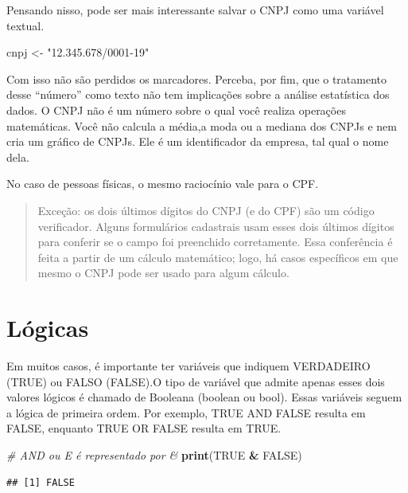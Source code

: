 \documentclass[
]{book}
\newenvironment{Shaded}{\begin{snugshade}}{\end{snugshade}}
\newcommand{\CommentTok}[1]{\textcolor[rgb]{0.56,0.35,0.01}{\textit{#1}}}
\newcommand{\KeywordTok}[1]{\textcolor[rgb]{0.13,0.29,0.53}{\textbf{#1}}}
\newcommand{\NormalTok}[1]{#1}
\newcommand{\OperatorTok}[1]{\textcolor[rgb]{0.81,0.36,0.00}{\textbf{#1}}}
\newcommand{\OtherTok}[1]{\textcolor[rgb]{0.56,0.35,0.01}{#1}}
\newcommand{\StringTok}[1]{\textcolor[rgb]{0.31,0.60,0.02}{#1}}
\begin{document}
Pensando nisso, pode ser mais interessante salvar o CNPJ como uma variável textual.

\begin{Shaded}
\begin{Highlighting}[]
\NormalTok{cnpj <-}\StringTok{ "12.345.678/0001-19"}
\end{Highlighting}
\end{Shaded}

Com isso não são perdidos os marcadores. Perceba, por fim, que o tratamento desse ``número'' como texto não tem implicações sobre a análise estatística dos dados. O CNPJ não é um número sobre o qual você realiza operações matemáticas. Você não calcula a média,a moda ou a mediana dos CNPJs e nem cria um gráfico de CNPJs. Ele é um identificador da empresa, tal qual o nome dela.

No caso de pessoas físicas, o mesmo raciocínio vale para o CPF.

\begin{quote}
Exceção: os dois últimos dígitos do CNPJ (e do CPF) são um código verificador. Alguns formulários cadastrais usam esses dois últimos dígitos para conferir se o campo foi preenchido corretamente. Essa conferência é feita a partir de um cálculo matemático; logo, há casos específicos em que mesmo o CNPJ pode ser usado para algum cálculo.
\end{quote}

\hypertarget{luxf3gicas}{%
\section{Lógicas}\label{luxf3gicas}}

Em muitos casos, é importante ter variáveis que indiquem VERDADEIRO (TRUE) ou FALSO (FALSE).O tipo de variável que admite apenas esses dois valores lógicos é chamado de Booleana (boolean ou bool). Essas variáveis seguem a lógica de primeira ordem. Por exemplo, TRUE AND FALSE resulta em FALSE, enquanto TRUE OR FALSE resulta em TRUE.

\begin{Shaded}
\begin{Highlighting}[]
\CommentTok{# AND ou E é representado por &}
\KeywordTok{print}\NormalTok{(}\OtherTok{TRUE} \OperatorTok{&}\StringTok{ }\OtherTok{FALSE}\NormalTok{)}
\end{Highlighting}
\end{Shaded}

\begin{verbatim}
## [1] FALSE
\end{verbatim}
\end{document}
